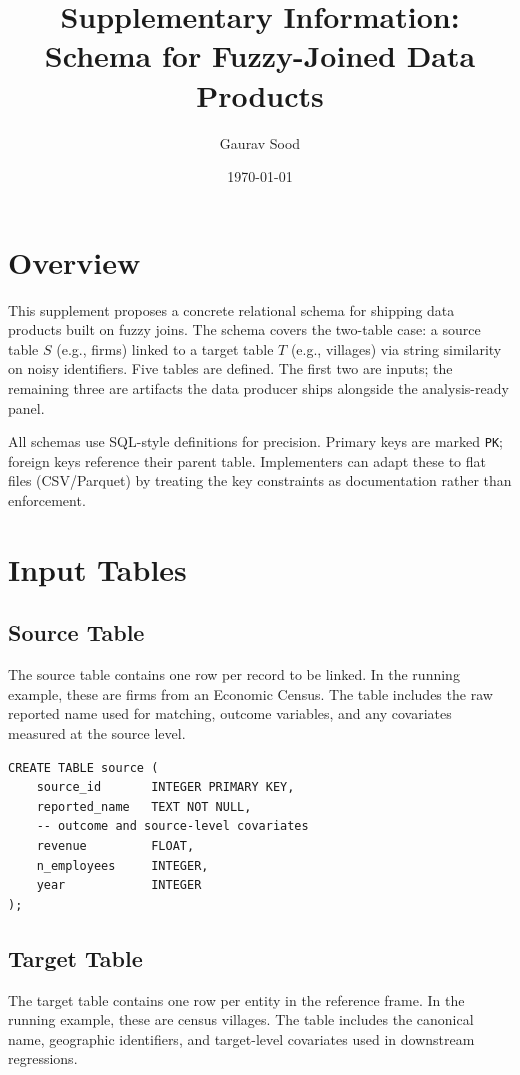 \documentclass[12pt]{article}
\title{Supplementary Information:\\Schema for Fuzzy-Joined Data Products}
\author{Gaurav Sood}
\date{\today}
\begin{document}
\maketitle

\section*{Overview}

This supplement proposes a concrete relational schema for shipping data products built on fuzzy joins. The schema covers the two-table case: a source table $S$ (e.g., firms) linked to a target table $T$ (e.g., villages) via string similarity on noisy identifiers. Five tables are defined. The first two are inputs; the remaining three are artifacts the data producer ships alongside the analysis-ready panel.

All schemas use SQL-style definitions for precision. Primary keys are marked \texttt{PK}; foreign keys reference their parent table. Implementers can adapt these to flat files (CSV/Parquet) by treating the key constraints as documentation rather than enforcement.

\section{Input Tables}

\subsection{Source Table}

The source table contains one row per record to be linked. In the running example, these are firms from an Economic Census. The table includes the raw reported name used for matching, outcome variables, and any covariates measured at the source level.

\begin{lstlisting}[style=sql]
CREATE TABLE source (
    source_id       INTEGER PRIMARY KEY,
    reported_name   TEXT NOT NULL,
    -- outcome and source-level covariates
    revenue         FLOAT,
    n_employees     INTEGER,
    year            INTEGER
);
\end{lstlisting}

\subsection{Target Table}

The target table contains one row per entity in the reference frame. In the running example, these are census villages. The table includes the canonical name, geographic identifiers, and target-level covariates used in downstream regressions.
\end{document}
